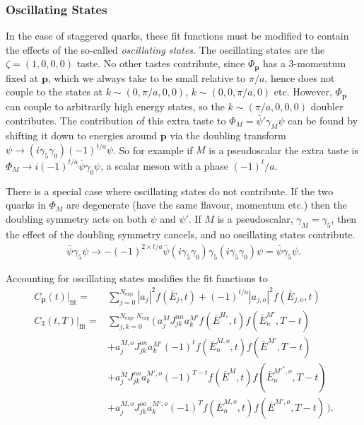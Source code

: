 \subsubsection{Oscillating States}

In the case of staggered quarks, these fit functions must be modified to contain the effects of the so-called {\it{oscillating states}}.
The oscillating states are the  $\zeta=(1,0,0,0)$ taste. No other tastes contribute, since $\Phi_{{\textbf{p}}}$ has a 3-momentum fixed at ${\textbf{p}}$, which we always take to be small relative to $\pi/a$, hence does not couple to the states at $k\sim(0,\pi/a,0,0)$, $k\sim(0,0,\pi/a,0)$ etc. However, $\Phi_{{\textbf{p}}}$ can couple to arbitrarily high energy states, so the $k\sim(\pi/a,0,0,0)$ doubler contributes. The contribution of this extra taste to $\Phi_M = \bar{\psi}'\gamma_M\psi$ can be found by shifting it down to energies around ${\textbf{p}}$ via the doubling transform $\psi\to (i\gamma_5\gamma_0)(-1)^{t/a} \psi$. So for example if $M$ is a pseudoscalar the extra taste is $\Phi_M \to i(-1)^{t/a} \bar{\psi}\gamma_0 \psi$, a scalar meson with a phase $(-1)^t/a$.

There is a special case where oscillating states do not contribute. If the two quarks in $\Phi_M$ are degenerate (have the same flavour, momentum etc.) then the doubling symmetry acts on both $\psi$ and $\psi'$. If $M$ is a pseudoscalar, $\gamma_M=\gamma_5$, then the effect of the doubling symmetry cancels, and no oscillating states contribute.
\begin{align}
  \bar{\psi}\gamma_5 \psi \to -(-1)^{2\times t/a} \bar{\psi} (i\gamma_5\gamma_0) \gamma_5 (i\gamma_5\gamma_0) \psi = \bar{\psi}\gamma_5\psi.
\end{align}

Accounting for oscillating states modifies the fit functions to
\begin{align}
  \label{eq:2ptcorrelator_real}
  C_{\textbf{p}}(t)|_{\text{fit}} =& \sum_{j=0}^{N_{\text{exp}}} |a_j|^2 f(\bar{E}_j,t) + (-1)^{t/a} |a_{j,o}|^2 f(\bar{E}_{j,o},t) \\
  C_{3}(t,T)|_{\text{fit}} =& \sum_{j,k=0}^{N_{\text{exp}},N_{\text{exp}}} \Big(\, a^{M}_j J^{nn}_{jk} a^{M'}_k f(\bar{E}^{H_s},t) f(\bar{E}^{M'}_n,T-t)
  \\ \nonumber
  &+a^{M,o}_j J^{on}_{jk} a^{M'}_k (-1)^t f(\bar{E}^{M,o}_n,t) f(\bar{E}^{M'},T-t)
  \\ \nonumber
  &+a^{M}_j J^{no}_{jk} a^{M',o}_k (-1)^{T-t} f(\bar{E}^{M},t) f(\bar{E}^{M'^*,o}_n,T-t)
  \\
  &+a^{M,o}_j J^{oo}_{jk} a^{M',o}_k (-1)^T f(\bar{E}^{M,o}_n,t) f(\bar{E}^{M',o},T-t) \,\Big).
  \label{eq:3ptcorrelator_real}
\end{align}

